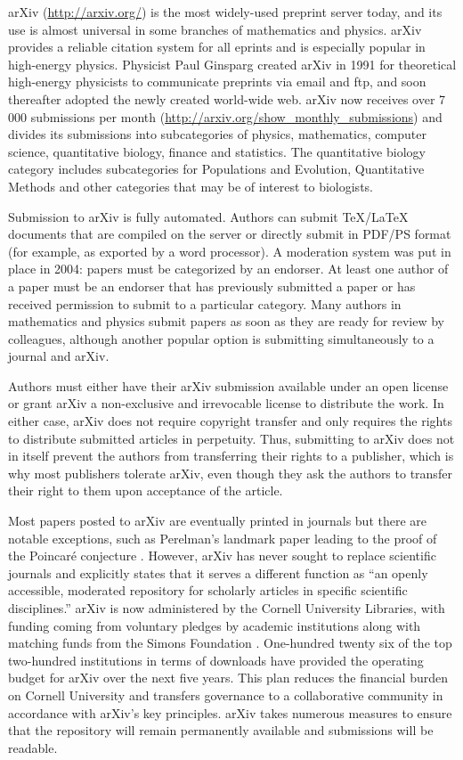 \documentclass[letterpaper,twocolumn,superscriptaddress,showkeys,longbibliography]{revtex4-1}
\begin{document}
arXiv (\url{http://arxiv.org/}) is the most widely-used preprint server today,
and its use is almost universal in some branches of mathematics and physics.
arXiv provides a reliable citation system for all eprints and is especially
popular in high-energy physics. Physicist Paul Ginsparg created arXiv in 1991
for theoretical high-energy physicists to communicate preprints via email and
ftp, and soon thereafter adopted the newly created world-wide
web\cite{jackson2002preprints}.  arXiv now receives over 7 000 submissions per
month (\url{http://arxiv.org/show_monthly_submissions}) and divides its
submissions into subcategories of physics, mathematics, computer science,
quantitative biology, finance and statistics.  The quantitative biology category
includes subcategories for Populations and Evolution, Quantitative Methods and
other categories that may be of interest to biologists.

Submission to arXiv is fully automated.  Authors can submit \TeX{}/\LaTeX{}
documents that are compiled on the server or directly submit in PDF/PS format
(for example, as exported by a word processor).  A moderation system was put in
place in 2004: papers must be categorized by an endorser. At least one author of
a paper must be an endorser that has previously submitted a paper or has
received permission to submit to a particular category.  Many authors in
mathematics and physics submit papers as soon as they are ready for review by
colleagues, although another popular option is submitting simultaneously to a
journal and arXiv.

Authors must either have their arXiv submission available under an open license
or grant arXiv a non-exclusive and irrevocable license to distribute the work.
In either case, arXiv does not require copyright transfer and only requires the
rights to distribute submitted articles in perpetuity. Thus, submitting to arXiv
does not in itself prevent the authors from transferring their rights to a
publisher, which is why most publishers tolerate arXiv, even though they ask the
authors to transfer their right to them upon acceptance of the article.

Most papers posted to arXiv are eventually printed in journals but there are
notable exceptions, such as Perelman's landmark paper leading to the proof of
the Poincar\'{e} conjecture \cite{2002math.....11159P}.  However, arXiv has
never sought to replace scientific journals and explicitly states that it serves
a different function as ``an openly accessible, moderated repository for
scholarly articles in specific scientific disciplines.'' arXiv is now
administered by the Cornell University Libraries, with funding coming from
voluntary pledges by academic institutions along with matching funds from the
Simons Foundation \cite{arxiv_future}.  One-hundred twenty six of the top
two-hundred institutions in terms of downloads have provided the operating
budget for arXiv over the next five years.  This plan reduces the financial
burden on Cornell University and transfers governance to a collaborative
community in accordance with arXiv's key principles.  arXiv takes numerous
measures to ensure that the repository will remain permanently available and
submissions will be readable.
\end{document}
